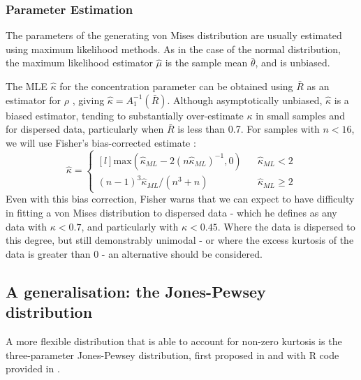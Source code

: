 \documentclass[../../ArchStats.tex]{subfiles}
\begin{document}


\subsubsection{Parameter Estimation}

The parameters of the generating von Mises distribution are usually estimated using maximum likelihood methods. As in the case of the normal distribution, the maximum likelihood estimator $\hat{\mu}$ is the sample mean $\bar{\theta}$, and is unbiased.

The MLE $\hat{\kappa}$ for the concentration parameter can be obtained using $\bar{R}$ as an estimator for $\rho$ , giving $\hat{\kappa} = A_1^{-1}(\bar{R})$. Although asymptotically unbiased, $\hat{\kappa}$ is a biased estimator, tending to substantially over-estimate $\kappa$ in small samples and for dispersed data, particularly when $\bar{R}$ is less than 0.7. For samples with $n < 16$, we will use Fisher's bias-corrected estimate \cite{Fisher1993}:
\[\hat{\kappa} = \left\lbrace \begin{matrix*}[l]
\text{max} ( \hat{\kappa}_{ML} - 2(n \hat{\kappa}_{ML})^{-1}, 0) & & \hat{\kappa}_{ML} < 2 \\
(n-1)^3 \hat{\kappa}_{ML} / (n^3 + n) & &  \hat{\kappa}_{ML} \geq 2
\end{matrix*} \right. \]
Even with this bias correction, Fisher warns that we can expect to have difficulty in fitting a von Mises distribution to dispersed data -  which he defines as any data with $\kappa < 0.7$, and particularly with $\kappa < 0.45$. Where the data is dispersed to this degree, but still demonstrably unimodal - or where the excess kurtosis of the data is greater than 0 - an alternative should be considered.



\subsection{A generalisation: the Jones-Pewsey distribution}
\label{sec:Jones-Pewsey}
A more flexible distribution that is able to account for non-zero kurtosis is the three-parameter Jones-Pewsey distribution, first proposed in \cite{Jones2005} and with R code provided in \cite{Pewsey2014}.
\end{document}
